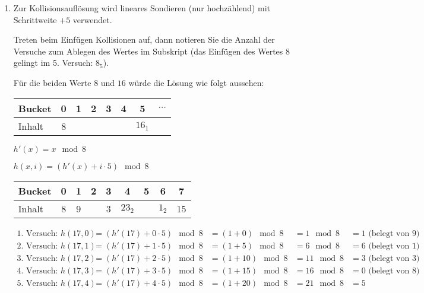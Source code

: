 \documentclass{bschlangaul-aufgabe}
\begin{document}
\begin{enumerate}
\item {}

Zur Kollisionsauflösung wird lineares Sondieren (nur hochzählend) mit
Schrittweite $+5$ verwendet.

Treten beim Einfügen Kollisionen auf, dann notieren Sie die Anzahl der
Versuche zum Ablegen des Wertes im Subskript (\zB das Einfügen des
Wertes 8 gelingt im 5. Versuch: $8_5$).


Für die beiden Werte $8$ und $16$ würde die Lösung wie folgt aussehen:

\begin{center}
\begin{tabular}{l|ccccccc}
Bucket    & 0  & 1      & 2 & 3 & 4 & 5 &  $\cdots$  \\\hline
Inhalt    & 8 & &&&& $16_1$\\
\end{tabular}
\end{center}

\begin{bAntwort}
$h'(x) = x \mod 8$

$h(x, i) = (h'(x) + i \cdot 5) \mod 8$


\begin{center}
\begin{tabular}{l|cccccccc}
Bucket    & 0  & 1 & 2     & 3 & 4      & 5 & 6     & 7 \\\hline
Inhalt    & 8  & 9 &       & 3 & $23_2$ &   & $1_2$ & 15 \\
\end{tabular}
\end{center}

{\tiny
\begin{equation*}
\begin{aligned}
\text{1. Versuch: } h(17, 0) &= (h'(17) + 0 \cdot 5) \mod 8 &= (1 + 0) \mod 8  &= 1 \mod 8  &= 1 \text{ (belegt von } 9)\\
\text{2. Versuch: } h(17, 1) &= (h'(17) + 1 \cdot 5) \mod 8 &= (1 + 5) \mod 8  &= 6 \mod 8  &= 6 \text{ (belegt von } 1)\\
\text{3. Versuch: } h(17, 2) &= (h'(17) + 2 \cdot 5) \mod 8 &= (1 + 10) \mod 8 &= 11 \mod 8 &= 3 \text{ (belegt von } 3)\\
\text{4. Versuch: } h(17, 3) &= (h'(17) + 3 \cdot 5) \mod 8 &= (1 + 15) \mod 8 &= 16 \mod 8 &= 0 \text{ (belegt von } 8)\\
\text{5. Versuch: } h(17, 4) &= (h'(17) + 4 \cdot 5) \mod 8 &= (1 + 20) \mod 8 &= 21 \mod 8 &= 5\\
\end{aligned}
\end{equation*}
}


\end{bAntwort}
\end{enumerate}
\end{document}
